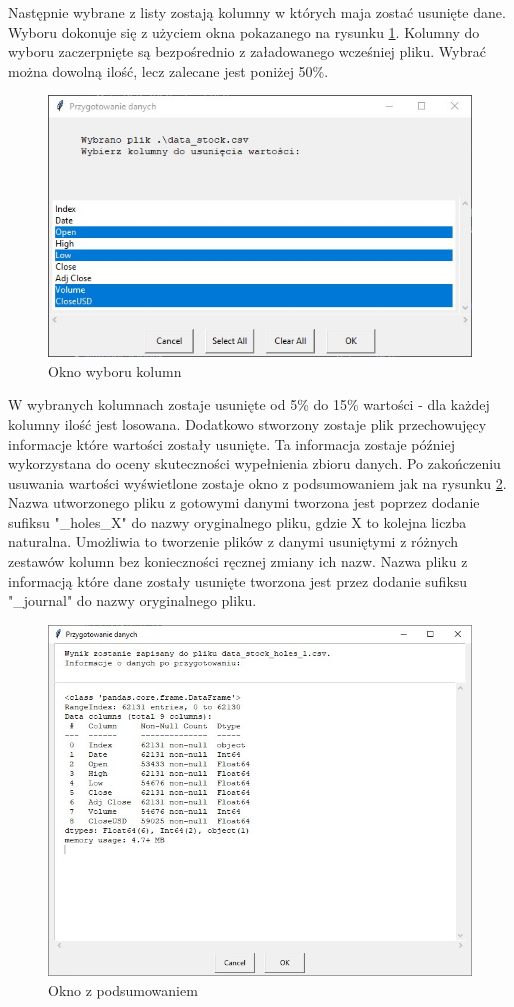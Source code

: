 \documentclass[12pt,twoside]{article}
\begin{document}
Następnie wybrane z listy zostają kolumny w których maja zostać usunięte dane.
Wyboru dokonuje się z użyciem okna pokazanego na rysunku \ref{Fig:gen_col}.
Kolumny do wyboru zaczerpnięte są bezpośrednio z załadowanego wcześniej pliku.
Wybrać można dowolną ilość, lecz zalecane jest poniżej 50\%.

\begin{figure}[ht]
	\centering
	\includegraphics[width=12cm]{img/03.jpg}
	\caption{Okno wyboru kolumn}
\label{Fig:gen_col}
\end{figure}

W wybranych kolumnach zostaje usunięte od 5\%
do 15\% wartości - dla każdej kolumny ilość jest losowana.
Dodatkowo stworzony zostaje plik przechowujęcy informacje które wartości zostały usunięte.
Ta informacja zostaje później wykorzystana do oceny skuteczności wypełnienia zbioru danych.
Po zakończeniu usuwania wartości wyświetlone zostaje okno z podsumowaniem jak na rysunku \ref{Fig:gen_end}.
Nazwa utworzonego pliku z gotowymi danymi tworzona jest
poprzez dodanie sufiksu "\_holes\_X" do nazwy oryginalnego pliku, gdzie X to kolejna liczba naturalna.
Umożliwia to tworzenie plików z danymi usuniętymi z różnych zestawów kolumn bez konieczności ręcznej zmiany ich nazw.
Nazwa pliku z informacją które dane zostały usunięte tworzona jest
przez dodanie sufiksu "\_journal" do nazwy oryginalnego pliku.

\begin{figure}[ht]
	\centering
	\includegraphics[width=12cm]{img/04.jpg}
	\caption{Okno z podsumowaniem}
\label{Fig:gen_end}
\end{figure}
\end{document}
